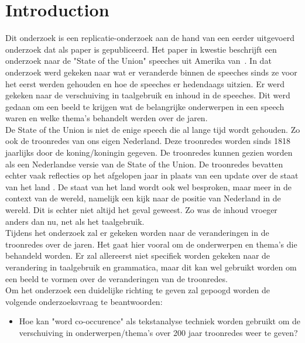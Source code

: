 \section{Introduction}
\label{sec:intro}

Dit onderzoek is een replicatie-onderzoek aan de hand van een eerder uitgevoerd onderzoek dat als paper is gepubliceerd. Het paper in kwestie beschrijft een onderzoek naar de "State of the Union" speeches uit Amerika van~\cite{state}. In dat onderzoek werd gekeken naar wat er veranderde binnen de speeches sinds ze voor het eerst werden gehouden en hoe de speeches er hedendaags uitzien. Er werd gekeken naar de verschuiving in taalgebruik en inhoud in de speeches. Dit werd gedaan om een beeld te krijgen wat de belangrijke onderwerpen in een speech waren en welke thema's behandelt  werden over de jaren. 
\\
De State of the Union is niet de enige speech die al lange tijd wordt gehouden. Zo ook de troonredes van ons eigen Nederland. Deze troonredes worden sinds 1818 jaarlijks door de koning/koningin gegeven. De troonredes kunnen gezien worden als een Nederlandse versie van de State of the Union. De troonredes bevatten echter vaak reflecties op het afgelopen jaar in plaats van een update over de staat van het land . De staat van het land wordt ook wel besproken, maar meer in de context van de wereld, namelijk een kijk naar de positie van Nederland in de wereld. Dit is echter niet altijd het geval geweest. Zo was de inhoud vroeger anders dan nu, net als het taalgebruik.
\\
Tijdens het onderzoek zal er gekeken worden naar de veranderingen in de troonredes over de jaren. Het gaat hier vooral om de onderwerpen en thema's die behandeld worden. Er zal allereerst niet specifiek worden gekeken naar de verandering in taalgebruik en grammatica, maar dit kan wel gebruikt worden om een beeld te vormen over de veranderingen van de troonredes.
\\
Om het onderzoek een duidelijke richting te geven zal gepoogd worden de volgende onderzoeksvraag te beantwoorden:

\begin{itemize}
\item Hoe kan "word co-occurence" als tekstanalyse techniek worden gebruikt om de verschuiving in onderwerpen/thema's over 200 jaar troonredes weer te geven?
\end{itemize}

